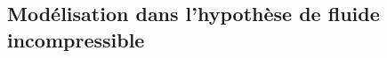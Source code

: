 \documentclass[10pt,fleqn]{article} %
\begin{document}
\begin{multicols}{2}
\subsection*{Modélisation dans l'hypothèse de fluide incompressible}
%
%
%
%
%
%


\end{multicols}
\end{document}
